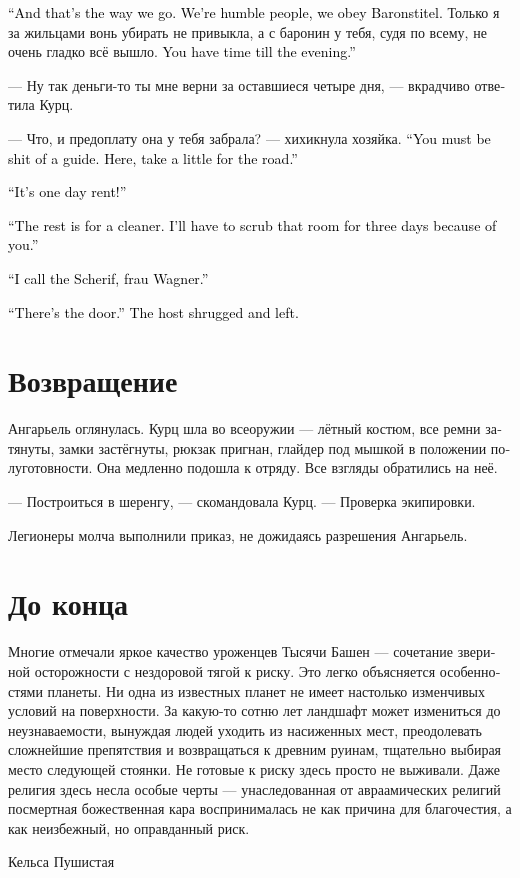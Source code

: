 \documentclass[a4paper,12pt,fleqn]{book}\usepackage{cooltooltips}\usepackage{polyglossia}\setdefaultlanguage[babelshorthands=true]{russian}\setotherlanguage{english}\defaultfontfeatures{Ligatures=TeX,Mapping=tex-text} \usepackage{xcolor}\definecolor{lightgray}{HTML}{bbbbbb}\color{lightgray}\newcommand{\ml}[3]{\textenglish{\textcolor{black}{#3}}}
\begin{document}
\ml{$0$}
{--- А так оно и будет.}
{``And that's the way we go.}
\ml{$0$}
{Мы люди маленькие, баронство слушаем.}
{We're humble people, we obey Baronstitel.}
Только я за жильцами вонь убирать не привыкла, а с баронин у тебя, судя по всему, не очень гладко всё вышло.
\ml{$0$}
{Даю время до вечера.}
{You have time till the evening.''}

--- Ну так деньги-то ты мне верни за оставшиеся четыре дня, --- вкрадчиво ответила Курц.

--- Что, и предоплату она у тебя забрала? --- хихикнула хозяйка.
\ml{$0$}
{--- Паршивый же из тебя проводник, должно быть.}
{``You must be shit of a guide.}
\ml{$0$}
{На, держи на дорожку.}
{Here, take a little for the road.''}

\ml{$0$}
{--- Тут за один день!}
{``It's one day rent!''}

\ml{$0$}
{--- Остальное на уборщика.}
{``The rest is for a cleaner.}
\ml{$0$}
{Из-за тебя я комнату ещё три дня драить буду.}
{I'll have to scrub that room for three days because of you.''}

\ml{$0$}
{--- Я позову шерифа, фрау Вагнер.}
{``I call the Scherif, frau Wagner.''}

\ml{$0$}
{--- Дверь вон там, --- хозяйка пожала плечами и ушла.}
{``There's the door.'' The host shrugged and left.}

\section{Возвращение}

Ангарьель оглянулась.
Курц шла во всеоружии --- лётный костюм, все ремни затянуты, замки застёгнуты, рюкзак пригнан, глайдер под мышкой в положении полуготовности.
Она медленно подошла к отряду.
Все взгляды обратились на неё.

--- Построиться в шеренгу, --- скомандовала Курц.
--- Проверка экипировки.

Легионеры молча выполнили приказ, не дожидаясь разрешения Ангарьель.

\section{До конца}

\epigraph{Многие отмечали яркое качество уроженцев Тысячи Башен --- сочетание звериной осторожности с нездоровой тягой к риску.
Это легко объясняется особенностями планеты.
Ни одна из известных планет не имеет настолько изменчивых условий на поверхности.
За какую-то сотню лет ландшафт может измениться до неузнаваемости, вынуждая людей уходить из насиженных мест, преодолевать сложнейшие препятствия и возвращаться к древним руинам, тщательно выбирая место следующей стоянки.
Не готовые к риску здесь просто не выживали.
Даже религия здесь несла особые черты --- унаследованная от авраамических религий посмертная божественная кара воспринималась не как причина для благочестия, а как неизбежный, но оправданный риск.
}{Кельса Пушистая}
\end{document}
